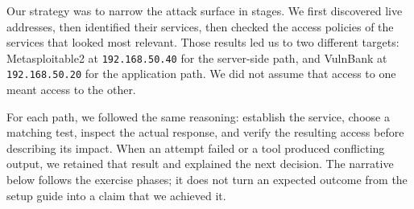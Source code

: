 \documentclass[11pt,a4paper]{article}
\begin{document}
Our strategy was to narrow the attack surface in stages. We first discovered live addresses, then identified their services, then checked the access policies of the services that looked most relevant. Those results led us to two different targets: Metasploitable2 at \texttt{192.168.50.40} for the server-side path, and VulnBank at \texttt{192.168.50.20} for the application path. We did not assume that access to one meant access to the other.

For each path, we followed the same reasoning: establish the service, choose a matching test, inspect the actual response, and verify the resulting access before describing its impact. When an attempt failed or a tool produced conflicting output, we retained that result and explained the next decision. The narrative below follows the exercise phases; it does not turn an expected outcome from the setup guide into a claim that we achieved it.

\begin{center}
\end{center}
\end{document}
